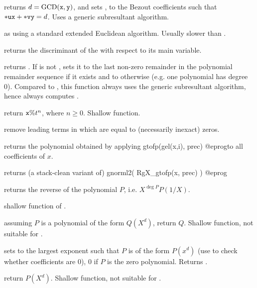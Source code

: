  returns
$d = {\rm GCD}({\tt x},{\tt y})$, and sets ,  to the Bezout
coefficients such that ${\tt *ux} + {\tt *vy} = d$. Uses a generic
subresultant algorithm.

 as
 using a standard extended Euclidean algorithm. Usually
slower than .

 returns the discriminant of the  
with respect to its main variable.

 returns
. If  is not , sets it to the last
non-zero remainder in the polynomial remainder sequence if it exists and to
 otherwise (e.g. one polynomial has degree 0). Compared to
, this function always uses the generic subresultant
algorithm, hence always computes .

 return ${\tt x \% } t^n$,
where $n\geq 0$. Shallow function.

 remove leading terms in  which are
equal to (necessarily inexact) zeros.

 returns the polynomial obtained by
applying
\bprog
  gtofp(gel(x,i), prec)
@eprog\noindent to all coefficients of $x$.

 returns (a stack-clean variant of)
\bprog
  gnorml2( RgX_gtofp(x, prec) )
@eprog

 returns the reverse of the polynomial
$P$, i.e. $X^{\deg P} P(1/X)$.

 shallow function of .

 assuming $P$ is a polynomial of the
form $Q(X^d)$, return $Q$. Shallow function, not suitable for
.

 sets  to the largest exponent
such that $P$ is of the form $P(x^d)$ (use  to check
whether coefficients are 0), $0$ if $P$ is the zero polynomial. Returns
.

 return $P(X^d)$. Shallow function, not
suitable for .

